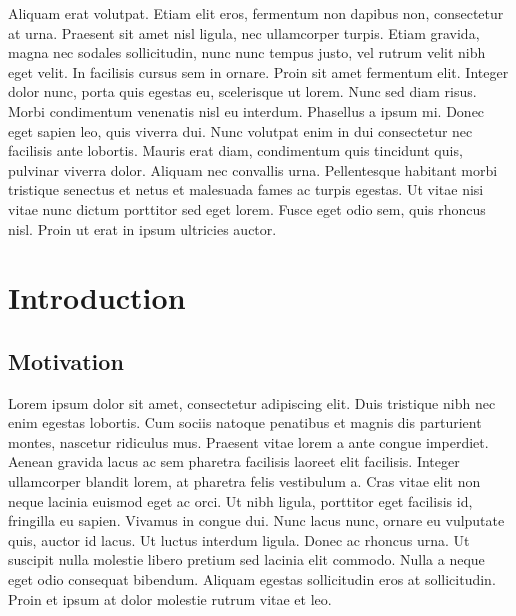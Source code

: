 \documentclass[12pt]{report}	%
\begin{document}
\begin{acknowledgments}
Aliquam erat volutpat. Etiam elit eros, fermentum non dapibus non, consectetur at urna. Praesent sit amet nisl ligula, nec ullamcorper turpis. Etiam gravida, magna nec sodales sollicitudin, nunc nunc tempus justo, vel rutrum velit nibh eget velit. In facilisis cursus sem in ornare. Proin sit amet fermentum elit. Integer dolor nunc, porta quis egestas eu, scelerisque ut lorem. Nunc sed diam risus. Morbi condimentum venenatis nisl eu interdum. Phasellus a ipsum mi. Donec eget sapien leo, quis viverra dui. Nunc volutpat enim in dui consectetur nec facilisis ante lobortis. Mauris erat diam, condimentum quis tincidunt quis, pulvinar viverra dolor. Aliquam nec convallis urna. Pellentesque habitant morbi tristique senectus et netus et malesuada fames ac turpis egestas. Ut vitae nisi vitae nunc dictum porttitor sed eget lorem. Fusce eget odio sem, quis rhoncus nisl. Proin ut erat in ipsum ultricies auctor.

\end{acknowledgments}



\tableofcontents   %

\listoftables      %

\listoffigures     %



%
%
%

\chapter{Introduction}
	\section{Motivation}
	Lorem ipsum dolor sit amet, consectetur adipiscing elit. Duis tristique nibh nec enim egestas lobortis. Cum sociis natoque penatibus et magnis dis parturient montes, nascetur ridiculus mus. Praesent vitae lorem a ante congue imperdiet. Aenean gravida lacus ac sem pharetra facilisis laoreet elit facilisis. Integer ullamcorper blandit lorem, at pharetra felis vestibulum a. Cras vitae elit non neque lacinia euismod eget ac orci. Ut nibh ligula, porttitor eget facilisis id, fringilla eu sapien. Vivamus in congue dui. Nunc lacus nunc, ornare eu vulputate quis, auctor id lacus. Ut luctus interdum ligula. Donec ac rhoncus urna. Ut suscipit nulla molestie libero pretium sed lacinia elit commodo. Nulla a neque eget odio consequat bibendum. Aliquam egestas sollicitudin eros at sollicitudin. Proin et ipsum at dolor molestie rutrum vitae et leo.
\end{document}
